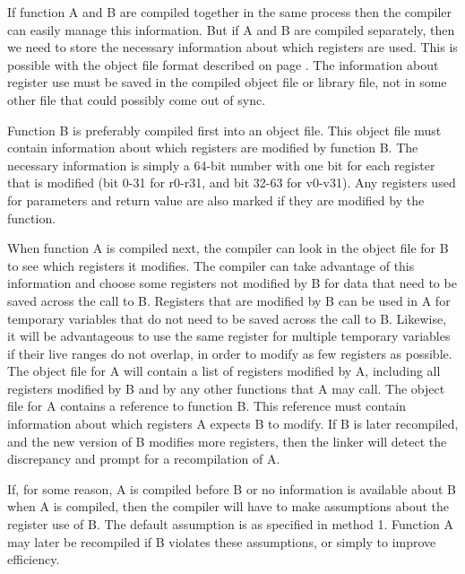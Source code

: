 \documentclass[forwardcom.tex]{subfiles}
\begin{document}
If function A and B are compiled together in the same process then the compiler can easily manage this information. But if A and B are compiled separately, then we need to store the necessary information about which registers are used. This is possible with the object file format described on page \pageref{objectFileFormat}. The information about register use must be saved in the compiled object file or library file, not in some other file that could possibly come out of sync. 
\vspace{2mm}

Function B is preferably compiled first into an object file. This object file must contain information about which registers are modified by function B. The necessary information is simply a 64-bit number with one bit for each register that is modified (bit 0-31 for r0-r31, and bit 32-63 for v0-v31). Any registers used for parameters and return value are also marked if they are modified by the function.
\vspace{2mm}

When function A is compiled next, the compiler can look in the object file for B to see which registers it modifies. The compiler can take advantage of this information and choose some registers not modified by B for data that need to be saved across the call to B. Registers that are modified by B can be used in A for temporary variables that do not need to be saved across the call to B. Likewise, it will be advantageous to use the same register for multiple temporary variables if their live ranges do not overlap, in order to modify as few registers as possible. The object file for A will contain a list of registers modified by A, including all registers modified by B and by any other functions that A may call. The object file for A contains a reference to function B. This reference must contain information about which registers A expects B to modify. If B is later recompiled, and the new version of B modifies more registers, then the linker will detect the discrepancy and prompt for a recompilation of A.
\vspace{2mm}

If, for some reason, A is compiled before B or no information is available about B when A is compiled, then the compiler will have to make assumptions about the register use of B. The default assumption is as specified in method 1. Function A may later be recompiled if B violates these assumptions, or simply to improve efficiency. 
\vspace{2mm}
\end{document}
